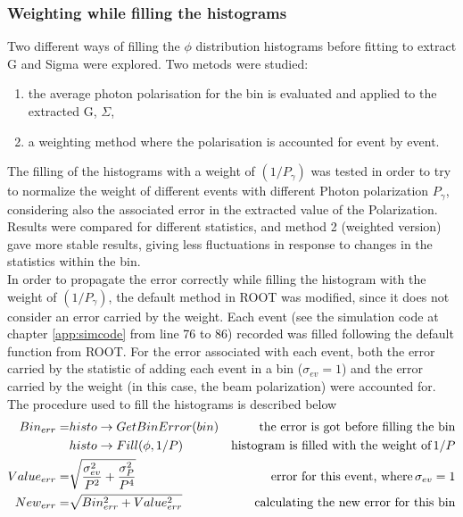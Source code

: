 \subsubsection{Weighting while filling the histograms} \label{sec:weighthisto}
Two different ways of filling the $\phi$ distribution histograms before fitting to extract G and Sigma were explored. Two metods were studied:
\begin{enumerate}
\item the average photon polarisation for the bin is evaluated and applied to the extracted G, $\Sigma$, 
\item  a weighting method where the polarisation is accounted for event by event.
\end{enumerate}
 The filling of the histograms with a weight of $(1/P_{\gamma})$ was tested in order to try to normalize the weight of different events with different Photon polarization  $P_{\gamma}$, considering also the associated error in the extracted value of the Polarization. Results were compared for different statistics, and method 2 (weighted version) gave more stable results, giving less fluctuations in response to changes in the statistics within the bin. \\
In order to propagate the error correctly while filling the histogram with the weight of $(1/P_{\gamma})$, the default method in ROOT was modified, since it does not consider an error carried by the weight.
Each event (see the simulation code at chapter \ref{app:simcode} from line 76 to 86) recorded was filled following the default function from ROOT. For the error associated with each event, both the error carried by the statistic of adding each event in a bin ($\sigma_{ev} = 1$) and the error carried by the weight (in this case, the beam polarization) were accounted for. The procedure used to fill the histograms is described below 
\begin{align}
  Bin_{err} = & histo\rightarrow GetBinError(bin) &  \textnormal{the error is  got before filling the bin} \\
  &  histo\rightarrow Fill(\phi,1/P) & \textnormal{histogram is filled with the weight of}\, 1/P \\
  Value_{err} = & \sqrt{\frac{\sigma_{ev}^2}{P^2} + \frac{\sigma_P^2}{P^4}} & \textnormal{error for this event, where}\, \sigma_{ev}=1 \\
  New_{err} = & \sqrt{Bin_{err}^2 + Value_{err}^2} & \textnormal{calculating the new error for this bin}
\end{align}

